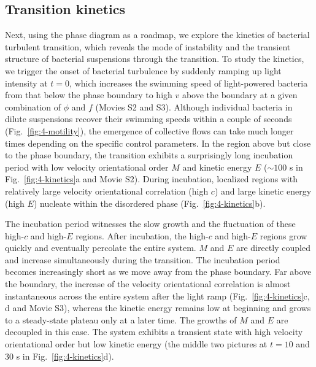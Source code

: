 \subsection{Transition kinetics}
Next, using the phase diagram as a roadmap, we explore the kinetics of bacterial turbulent transition, which reveals the mode of instability and the transient structure of bacterial suspensions through the transition. To study the kinetics, we trigger the onset of bacterial turbulence by suddenly ramping up light intensity at $t = 0$, which increases the swimming speed of light-powered bacteria from that below the phase boundary to high $v$ above the boundary at a given combination of $\phi$ and $f$ (Movies S2 and S3). Although individual bacteria in dilute suspensions recover their swimming speeds within a couple of seconds (Fig.~\ref{fig:4-motility}), the emergence of collective flows can take much longer times depending on the specific control parameters. In the region above but close to the phase boundary, the transition exhibits a surprisingly long incubation period with low velocity orientational order $M$ and kinetic energy $E$ ($\sim 100$ s in Fig.~\ref{fig:4-kinetics}a and Movie S2). During incubation, localized regions with relatively large velocity orientational correlation (high $c$) and large kinetic energy (high $E$) nucleate within the disordered phase (Fig.~\ref{fig:4-kinetics}b).

The incubation period witnesses the slow growth and the fluctuation of these high-$c$ and high-$E$ regions. After incubation, the high-$c$ and high-$E$ regions grow quickly and eventually percolate the entire system.
$M$ and $E$ are directly coupled and increase simultaneously during the transition. The incubation period becomes increasingly short as we move away from the phase boundary.
Far above the boundary, the increase of the velocity orientational correlation is almost instantaneous across the entire system after the light ramp (Fig.~\ref{fig:4-kinetics}c, d and Movie S3), whereas the kinetic energy remains low at beginning and grows to a steady-state plateau only at a later time.
The growths of $M$ and $E$ are decoupled in this case.
The system exhibits a transient state with high velocity orientational order but low kinetic energy (the middle two pictures at $t = 10$ and $30$ s in Fig.~\ref{fig:4-kinetics}d).


